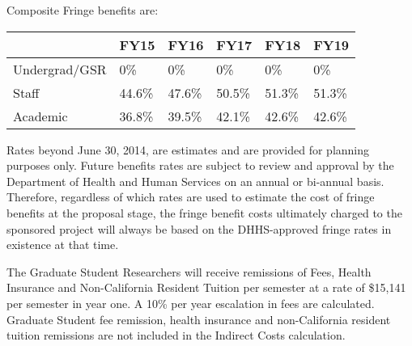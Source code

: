 \documentclass[onecolumn,11pt]{aastex}
\begin{document}
Composite Fringe benefits are:
\begin{table}
\begin{tabular}{| l | l | l | l | l | l |}
\hline
            ~ & FY15    & FY16    & FY17   & FY18   & FY19 \\ \hline \hline
Undergrad/GSR &	0\%     & 0\%     & 0\%    & 0\%    &  0\% \\ \hline
Staff         & 44.6\%  & 47.6\%  & 50.5\% & 51.3\% &  51.3\% \\ \hline
Academic      & 36.8\%  & 39.5\%  & 42.1\% & 42.6\% &   42.6\% \\ \hline
\hline
\end{tabular}
\label{tab:fringeBenefits}
\end{table}

Rates beyond June 30, 2014, are estimates and are provided for planning purposes only. Future benefits rates are subject to review and approval by the Department of Health and Human Services on an annual or bi-annual basis. Therefore, regardless of which rates are used to estimate the cost of fringe benefits at the proposal stage, the fringe benefit costs ultimately charged to the sponsored project will always be based on the DHHS-approved fringe rates in existence at that time.

The Graduate Student Researchers will receive remissions of Fees, Health Insurance and Non-California Resident Tuition per semester at a rate of \$15,141 per semester in year one.  A 10\% per year escalation in fees are calculated.  Graduate Student fee remission, health insurance and non-California resident tuition remissions are not included in the Indirect Costs calculation. 
\end{document}
